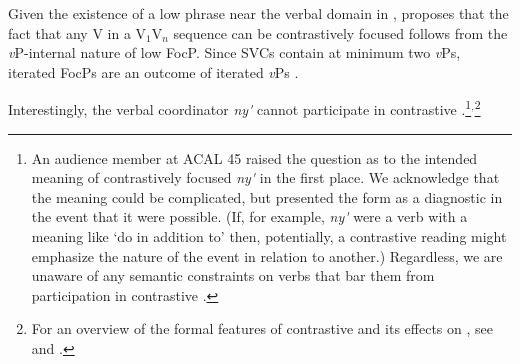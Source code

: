 \documentclass[output=paper
,newtxmath
,modfonts
,nonflat]{langsci/langscibook}
\begin{document}
\ea\label{ex:duncan-et-al:7}
\z
\z

\noindent Given the existence of a low  phrase near the verbal domain in  \citep{duncan-toappear}, \citet{duncan2016parallel} proposes that the fact that any V in a V$_1$V$_n$ sequence can be contrastively focused follows from the \textit{v}P-internal nature of low FocP. Since SVCs contain at minimum two \textit{v}Ps, iterated FocPs are an outcome of iterated \textit{v}Ps \citep[98-100]{duncan2016parallel}. 

Interestingly, the verbal coordinator \textit{ny\'{\textturnv}\ng} cannot participate in contrastive .\footnote{An audience member at ACAL 45 raised the question as to the intended meaning of contrastively focused \textit{ny\'{\textturnv}\ng} in the first place. We acknowledge that the meaning could be complicated, but presented the form as a diagnostic in the event that it were possible. (If, for example, \textit{ny\'{\textturnv}\ng} were a verb with a meaning like `do in addition to' then, potentially, a contrastive  reading might emphasize the nature of the event in relation to another.) Regardless, we are unaware of any semantic constraints on verbs that bar them from participation in contrastive .}$^,$\footnote{For an overview of the formal features of  contrastive  and its effects on , see \citet{akinlabi2003} and \citet{duncan-toappear}.}
\end{document}
